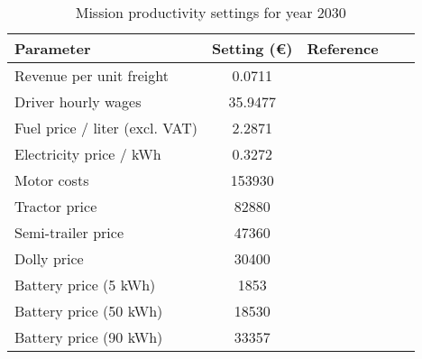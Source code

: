 \documentclass[ExampleMasters.tex]{subfiles}
\begin{document}
		\begin{table}[ht]
			\centering 
			\begin{tabular}{l c c c c}
	  			\hline
				Parameter & Setting (\euro) & Reference\\
				\hline
				\hline
				Revenue per unit freight & 0.0711 & \cite{EuAECOM2}\\
			    Driver hourly wages  & 35.9477 & \cite{EuAECOM2}\\
			    Fuel price / liter (excl. VAT)  & 2.2871  & \cite{EuAECOM2}\\
			    Electricity price / kWh  & 0.3272 & \cite{EUelectricity}\\
			    Motor costs  & 153930 & \cite{EuPLot30Motors}\\
			    Tractor price & 82880 & \cite{FrostSullivan}\\
			    Semi-trailer price & 47360 & \cite{FrostSullivan}\\
			    Dolly price & 30400 & \cite{FrostSullivan}\\
			    Battery price (5 kWh) & 1853 & \cite{ElementEnergy}\\
			    Battery price (50 kWh) & 18530 & \cite{ElementEnergy}\\
			    Battery price (90 kWh) & 33357 & \cite{ElementEnergy}\\
			\hline 
			\end{tabular}
			\caption{Mission productivity settings for year 2030} 
			\label{table:MissionProdSet2030} 
		\end{table}

	\clearpage
\end{document}
